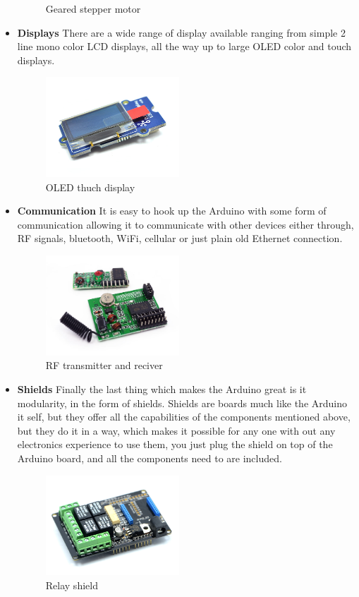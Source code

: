 \begin{itemize}
\begin{figure}[hbtp]
\caption{Geared stepper motor}
\end{figure}
\item[] \textbf{Displays} There are a wide range of display available ranging from simple 2 line mono color LCD displays, all the way up to large OLED color and touch displays. 
\begin{figure}[hbtp]
\centering
\includegraphics[width=5cm]{billeder/display.jpg}
\caption{OLED thuch display}
\end{figure}
\item[] \textbf{Communication} It is easy to hook up the Arduino with some form of communication allowing it to communicate with other devices either through, RF signals, bluetooth, WiFi, cellular or just plain old Ethernet connection.
\begin{figure}[hbtp]
\centering
\includegraphics[width=5cm]{billeder/com.jpg}
\caption{RF transmitter and reciver}
\end{figure}
\item[] \textbf{Shields} Finally the last thing which makes the Arduino great is it modularity, in the form of shields. Shields are boards much like the Arduino it self, but they offer all the capabilities of the components mentioned above, but they do it in a way, which makes it possible for any one with out any electronics experience to use them, you just plug the shield on top of the Arduino board, and all the components need to are included.
\begin{figure}[hbtp]
\centering
\includegraphics[width=5cm]{billeder/Shield.jpg}
\caption{Relay shield}
\end{figure}

\end{itemize}


